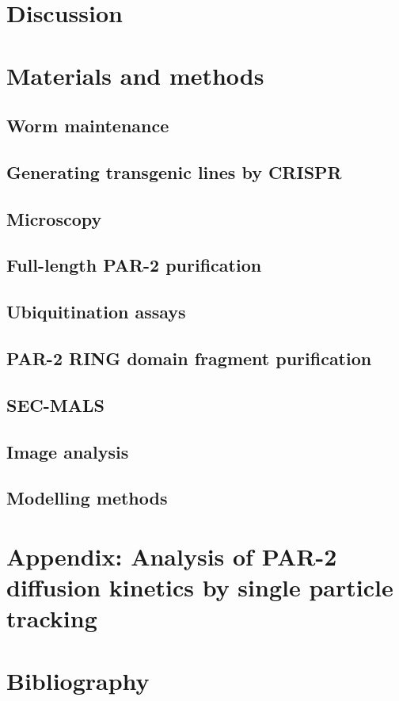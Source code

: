 \documentclass[12pt]{"article"}
\begin{document}
\clearpage
\section{Discussion}


\clearpage
\section{Materials and methods}


\subsection{Worm maintenance}
\subsection{Generating transgenic lines by CRISPR}
\subsection{Microscopy}
\subsection{Full-length PAR-2 purification}
\subsection{Ubiquitination assays}
\subsection{PAR-2 RING domain fragment purification}
\subsection{SEC-MALS}
\subsection{Image analysis}
\subsection{Modelling methods}

\clearpage
\section{Appendix: Analysis of PAR-2 diffusion kinetics by single particle tracking}


\clearpage
\section{Bibliography}
\end{document}
